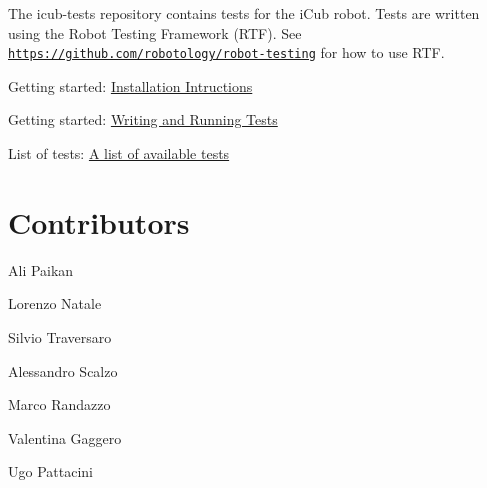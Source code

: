 The {\ttfamily icub-\/tests} repository contains tests for the i\+Cub robot. Tests are written using the Robot Testing Framework (R\+TF). See \href{https://github.com/robotology/robot-testing}{\tt https\+://github.\+com/robotology/robot-\/testing} for how to use R\+TF.

\begin{DoxyItemize}
\item Getting started\+: \hyperlink{installation}{Installation Intructions} \item Getting started\+: \hyperlink{writing-and-running}{Writing and Running Tests} \item List of tests\+: \hyperlink{group__icub-tests}{A list of available tests}\end{DoxyItemize}
\hypertarget{index_contributors}{}\section{Contributors}\label{index_contributors}
\begin{DoxyItemize}
\item Ali Paikan \item Lorenzo Natale \item Silvio Traversaro \item Alessandro Scalzo \item Marco Randazzo \item Valentina Gaggero \item Ugo Pattacini \end{DoxyItemize}
